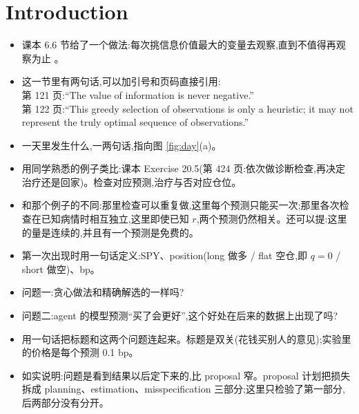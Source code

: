\documentclass{article}
\newenvironment{pts}{\begin{itemize}[nosep,leftmargin=1.15em,topsep=1pt]}{\end{itemize}}
\begin{document}
\section{Introduction}

\begin{note}[第 1 段,约 70 词:从课本出发]
\begin{pts}
\item 课本 6.6 节给了一个做法:每次挑信息价值最大的变量去观察,直到不值得再观察为止 \citep{kochenderfer2022algorithms}。
\item 这一节里有两句话,可以加引号和页码直接引用:\\
第 121 页:``The value of information is never negative.''\\
第 122 页:``This greedy selection of observations is only a heuristic; it may not represent the truly optimal sequence of observations.''
\end{pts}
\end{note}

\begin{note}[第 2 段,约 80 词:我们的问题]
\begin{pts}
\item 一天里发生什么,一两句话,指向图 \ref{fig:day}(a)。
\item 用同学熟悉的例子类比:课本 Exercise 20.5(第 424 页:依次做诊断检查,再决定治疗还是回家)。检查对应预测,治疗与否对应仓位。
\item 和那个例子的不同:那里检查可以重复做,这里每个预测只能买一次;那里各次检查在已知病情时相互独立,这里即使已知 $r$,两个预测仍然相关。还可以提:这里的量是连续的,并且有一个预测是免费的。
\item 第一次出现时用一句话定义:SPY、position(long 做多 / flat 空仓,即 $q=0$ / short 做空)、bp。
\end{pts}
\end{note}

\begin{note}[第 3 段,约 70 词:两个问题]
\begin{pts}
\item 问题一:贪心做法和精确解选的一样吗?
\item 问题二:agent 的模型预测``买了会更好'',这个好处在后来的数据上出现了吗?
\item 用一句话把标题和这两个问题连起来。标题是双关(花钱买别人的意见);实验里的价格是每个预测 0.1 bp。
\item 如实说明:问题是看到结果以后定下来的,比 proposal 窄。proposal 计划把损失拆成 planning、estimation、misspecification 三部分;这里只检验了第一部分,后两部分没有分开。
\end{pts}
\end{note}
\end{document}
